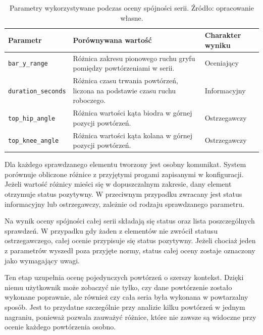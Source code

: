 \begin{table}[H]
\centering
\caption{Parametry wykorzystywane podczas oceny spójności serii. Źródło: opracowanie własne.}
\label{tab:parametry-spojnosci-serii}
\vspace{0.3cm}
\footnotesize
\renewcommand{\arraystretch}{1.25}
\begin{tabular}{|p{3.6cm}|p{6.3cm}|p{3.7cm}|}
\hline
\textbf{Parametr} & \textbf{Porównywana wartość} & \textbf{Charakter wyniku} \\
\hline

\texttt{bar\_y\_range} & Różnica zakresu pionowego ruchu gryfu pomiędzy powtórzeniami w serii. & Oceniający \\
\hline

\texttt{duration\_seconds} & Różnica czasu trwania powtórzeń, liczona na podstawie czasu ruchu roboczego. & Informacyjny \\
\hline

\texttt{top\_hip\_angle} & Różnica wartości kąta biodra w górnej pozycji powtórzeń. & Ostrzegawczy \\
\hline

\texttt{top\_knee\_angle} & Różnica wartości kąta kolana w górnej pozycji powtórzeń. & Ostrzegawczy \\
\hline

\end{tabular}
\end{table}

Dla każdego sprawdzanego elementu tworzony jest osobny komunikat. System porównuje obliczone różnice z przyjętymi progami zapisanymi w konfiguracji. Jeżeli wartość różnicy mieści się w dopuszczalnym zakresie, dany element otrzymuje status pozytywny. W przeciwnym przypadku zwracany jest status informacyjny lub ostrzegawczy, zależnie od rodzaju sprawdzanego parametru.

Na wynik oceny spójności całej serii składają się status oraz lista poszczególnych sprawdzeń. W przypadku gdy żaden z elementów nie zwrócił statusu ostrzegawczego, całej ocenie przypisuje się status pozytywny. Jeżeli chociaż jeden z parametrów wyszedł poza przyjęte normy, status całej oceny zostaje oznaczony jako wymagający uwagi.

Ten etap uzupełnia ocenę pojedynczych powtórzeń o szerszy kontekst. Dzięki niemu użytkownik może zobaczyć nie tylko, czy dane powtórzenie zostało wykonane poprawnie, ale również czy cała seria była wykonana w powtarzalny sposób. Jest to przydatne szczególnie przy analizie kilku powtórzeń w jednym nagraniu, ponieważ pozwala zauważyć różnice, które nie zawsze są widoczne przy ocenie każdego powtórzenia osobno.

